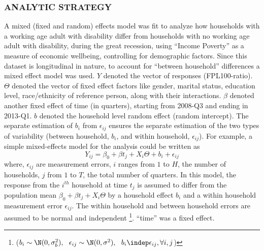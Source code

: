 \documentclass[11pt]{extarticle} %
\begin{document}
\subsubsection*{ANALYTIC STRATEGY}
A mixed (fixed and random) effects model was fit to analyze how households with a working age adult with disability differ from households with no working age adult with disability, during the great recession, using “Income Poverty” as a measure of economic wellbeing, controlling for demographic factors. Since this dataset is longitudinal in nature, to account for ``between household'' differences a mixed effect model was used. $Y$ denoted the vector of responses (FPL100-ratio). $\Theta$ denoted the vector of fixed effect factors like gender, marital status, education level, race/ethnicity of reference person, along with their interactions. $\beta$ denoted another fixed effect of time (in quarters), starting from 2008-Q3 and ending in 2013-Q1. $b$ denoted the household level random effect (random intercept). The separate estimation of $b_i$ from $\epsilon_{ij}$ ensures the separate estimation of the two types of variability (between household, $b_i$, and within household, $\epsilon_{ij}$). For example, a simple mixed-effects model for the analysis could be written as
\vspace{-0.5cm}
\begin{equation}
Y_{ij} = \beta_0 + \beta t_j + X_i\Theta + b_i + \epsilon_{ij}
\label{eq:MixedEffects1}
\end{equation}
where, $\epsilon_{ij}$ are measurement errors, $i$ ranges from $1$ to $H$, the number of households, $j$ from $1$ to $T$, the total number of quarters. In this model, the response from the $i^{th}$ household at time $t_j$ is assumed to differ from the population mean $\beta_0 + \beta t_j + X_i\Theta$ by a household effect $b_i$ and a within household measurement error $\epsilon_{ij}$. The within household and between household errors are assumed to be normal and independent \footnote{($b_i \sim \N(0, \sigma^2_b),\ \ \epsilon_{ij} \sim \N(0, \sigma^2), \ \ b_i \indep \epsilon_{ij}, \forall i, j$)}. ``time'' was a fixed effect. 
\end{document}
